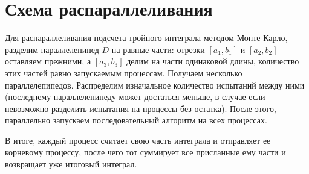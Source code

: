 \documentclass{report}
\begin{document}
\section*{Схема распараллеливания}
\par Для распараллеливания подсчета тройного интеграла методом Монте-Карло, разделим параллелепипед $D$ на равные части: отрезки $[a_1,b_1]$ и $[a_2,b_2]$ оставляем прежними, а $[a_3,b_3]$ делим на части одинаковой длины, количество этих частей равно запускаемым процессам. Получаем несколько параллелепипедов. Распределим изначальное количество испытаний между ними (последнему параллелепипеду может достаться меньше, в случае если невозможно разделить испытания на процессы без остатка). После этого, параллельно запускаем последовательный алгоритм на всех процессах.
\par В итоге, каждый процесс считает свою часть интеграла и отправляет ее корневому процессу, после чего тот суммирует все присланные ему части и возвращает уже итоговый интеграл.
\newpage

\end{document}
